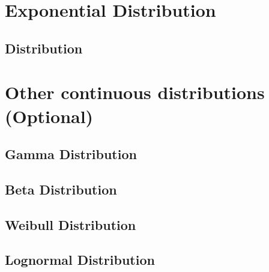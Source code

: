 \section{Exponential Distribution}  %
    \subsection{Distribution}  %

\section{Other continuous distributions (Optional)}  %
    \subsection{Gamma Distribution}  %
    \subsection{Beta Distribution}  %
    \subsection{Weibull Distribution}  %
    \subsection{Lognormal Distribution}  %